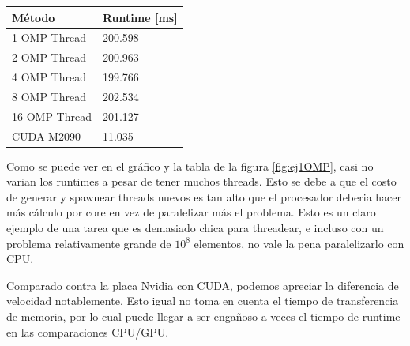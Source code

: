  \begin{table}[H]
    \begin{tabular}{l l}
        \textbf{M\'etodo} & \textbf{ Runtime [ms] }\\ \hline
    1 OMP Thread         & 200.598      \\
    2 OMP Thread          & 200.963      \\
    4 OMP Thread          & 199.766      \\
    8 OMP Thread  & 202.534      \\
    16 OMP Thread & 201.127      \\
        CUDA M2090 & 11.035 
    \end{tabular}
\end{table}



 Como se puede ver en el gr\'afico y la tabla de la figura \ref{fig:ej1OMP}, casi no varian los runtimes a pesar de tener
 muchos threads. Esto se debe a que el costo de generar y spawnear threads nuevos es tan alto que el procesador
 deberia hacer m\'as c\'alculo por core en vez de paralelizar m\'as el problema. Esto es un claro ejemplo
 de una tarea que es demasiado chica para threadear, e incluso con un problema relativamente grande de $10^8$ 
 elementos, no vale la pena paralelizarlo con CPU.

 Comparado contra la placa Nvidia con CUDA, podemos apreciar la diferencia de velocidad notablemente. Esto igual no toma
 en cuenta el tiempo de transferencia de memoria, por lo cual puede llegar a ser enga\~noso a veces el tiempo de runtime
 en las comparaciones CPU/GPU.
